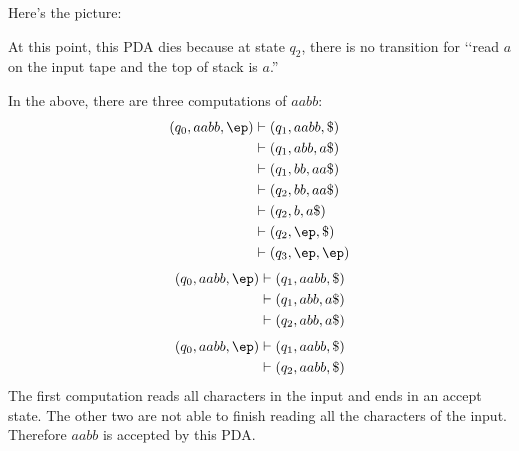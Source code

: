 Here's the picture:



At this point, this PDA dies because at state $q_2$, there is no
transition for \lq\lq read $a$ on the input tape and the top of stack is $a$.''

In the above, there are three computations of $aabb$:
\begin{align*}
  (q_0, aabb, \ep)
  &\vdash (q_1, aabb, \$) \\
  &\vdash (q_1, abb, a\$) \\
  &\vdash (q_1, bb, aa\$) \\
  &\vdash (q_2, bb, aa\$) \\
  &\vdash (q_2, b, a\$) \\
  &\vdash (q_2, \ep, \$) \\
  &\vdash (q_3, \ep, \ep) 
\end{align*}
\begin{align*}
(q_0, aabb, \ep) 
&\vdash (q_1, aabb, \$) \\
&\vdash (q_1, abb, a\$) \\
&\vdash (q_2, abb, a\$) 
\end{align*}
\begin{align*}
(q_0, aabb, \ep) 
&\vdash (q_1, aabb, \$) \\
&\vdash (q_2, aabb, \$) 
\end{align*}
The first computation reads all characters in the input and ends in an
accept state.
The other two are not able to finish reading all the characters of the input.
Therefore $aabb$ is accepted by this PDA.

